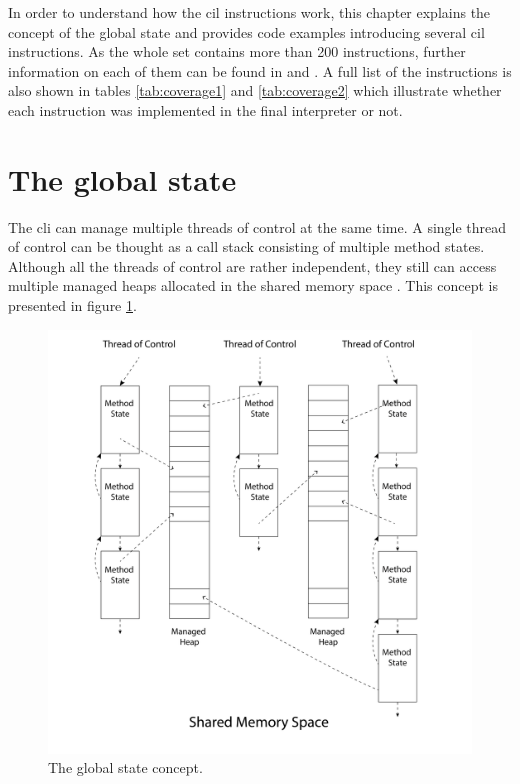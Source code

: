 \documentclass[declaration,shortabstract,english,mgr]{iithesis}
\begin{document}
In order to understand how the \acrshort{cil} instructions work, this chapter explains the concept of the global state and provides code examples introducing several \acrshort{cil} instructions. As the whole set contains more than 200 instructions, further information on each of them can be found in \cite{isoStandard} and \cite{ecmaStandard}. A full list of the instructions is also shown in tables \ref{tab:coverage1} and \ref{tab:coverage2} which illustrate whether each instruction was implemented in the final interpreter or not.

\section{The global state}
\label{sec:global_state}

The \acrshort{cli} can manage multiple threads of control at the same time. A single thread of control can be thought as a call stack consisting of multiple method states. Although all the threads of control are rather independent, they still can access multiple managed heaps allocated in the shared memory space \cite{ecmaStandard}. This concept is presented in figure \ref{fig:global_state}.

\begin{figure}
	\includegraphics[width=1\textwidth]{global_state.png}
    \centering
    \caption{The global state concept.}
    \label{fig:global_state}
\end{figure}
\end{document}
